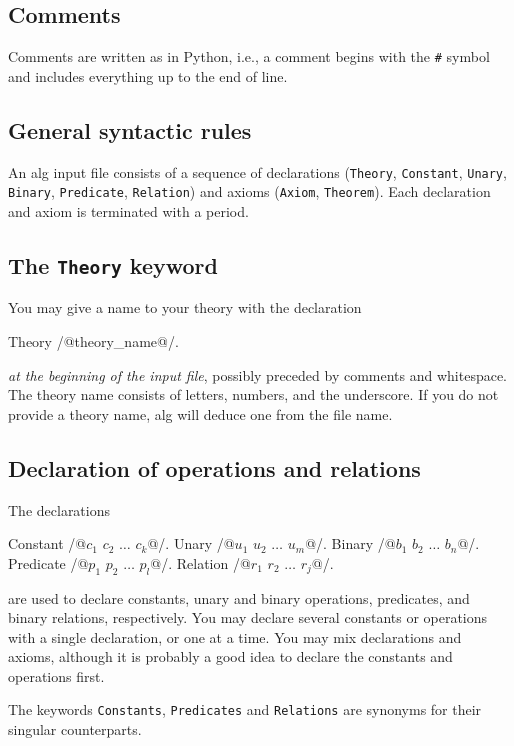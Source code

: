 \documentclass{article}
\begin{document}
\subsection{Comments}

Comments are written as in Python, i.e., a comment begins with the
\texttt{\#} symbol and includes everything up to the end of line.

\subsection{General syntactic rules}

An alg input file consists of a sequence of declarations
(\texttt{Theory}, \texttt{Constant}, \texttt{Unary}, \texttt{Binary},
\texttt{Predicate}, \texttt{Relation}) and axioms (\texttt{Axiom},
\texttt{Theorem}). Each declaration and axiom is terminated with a
period.

\subsection{The \texttt{Theory} keyword}

You may give a name to your theory with the declaration
%
\begin{source}
Theory /@theory_name@/.
\end{source}
%
\emph{at the beginning of the input file}, possibly preceded by
comments and whitespace. The theory name consists of letters, numbers,
and the underscore. If you do not provide a theory name, alg will
deduce one from the file name.

\subsection{Declaration of operations and relations}

The declarations
%
\begin{source}
Constant /@$c_1$ $c_2$ $\ldots$ $c_k$@/.
Unary /@$u_1$ $u_2$ $\ldots$ $u_m$@/.
Binary /@$b_1$ $b_2$ $\ldots$ $b_n$@/.
Predicate /@$p_1$ $p_2$ $\ldots$ $p_l$@/.
Relation /@$r_1$ $r_2$ $\ldots$ $r_j$@/.
\end{source}
%
are used to declare constants, unary and binary operations,
predicates, and binary relations, respectively. You may declare
several constants or operations with a single declaration, or one at a
time. You may mix declarations and axioms, although it is probably a
good idea to declare the constants and operations first.

The keywords \texttt{Constants}, \texttt{Predicates} and
\texttt{Relations} are synonyms for their singular counterparts.
\end{document}
